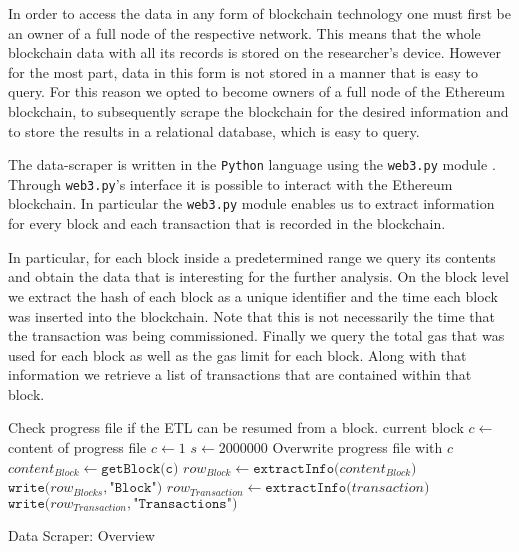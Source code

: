 In order to access the data in any form of blockchain technology one must first be an owner of a full node of the respective network. This means that the whole blockchain data with all its records is stored on the researcher's device. However for the most part, data in this form is not stored in a manner that is easy to query. For this reason we opted to become owners of a full node of the Ethereum blockchain, to subsequently scrape the blockchain for the desired information and to store the results in a relational database, which is easy to query.

The data-scraper is written in the \texttt{Python} language using the \texttt{web3.py} module \cite{Python, web3}. Through \texttt{web3.py}'s interface it is possible to interact with the Ethereum blockchain. In particular the \texttt{web3.py} module enables us to extract information for every block and each transaction that is recorded in the blockchain.

In particular, for each block inside a predetermined range we query its contents and obtain the data that is interesting for the further analysis. On the block level we extract the hash of each block as a unique identifier and the time each block was inserted into the blockchain. Note that this is not necessarily the time that the transaction was being commissioned. Finally we query the total gas that was used for each block as well as the gas limit for each block. Along with that information we retrieve a list of transactions that are contained within that block.


\begin{algorithm}
\begin{algorithmic}
\State Check progress file if the ETL can be resumed from a block.
    \State current block $c \gets$ content of progress file
\Else
    \State $c \gets 1$
\EndIf
\State $s \gets 2000000$ 
   \State Overwrite progress file with $c$ 
   \State $content_{Block} \gets \texttt{getBlock(c)}$
   \State $row_{Block} \gets \texttt{extractInfo(}content_{Block}\texttt{)}$
   \State $\texttt{write(} row_{Blocks}, \texttt{"Block")}$
       \State $row_{Transaction} \gets \texttt{extractInfo(}transaction\texttt{)}$
       \State $\texttt{write(} row_{Transaction}, \texttt{"Transactions")}$
   \EndFor
\EndWhile
\end{algorithmic}
\caption{Data Scraper: Overview}
\end{algorithm}


